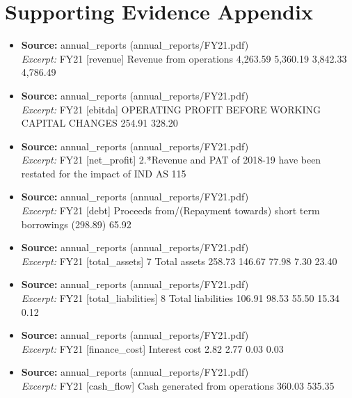 \documentclass[11pt,a4paper]{article}
\begin{document}
\section*{Supporting Evidence Appendix}
\begin{itemize}
\item \textbf{Source:} annual\_reports (annual\_reports/FY21.pdf) \\ \textit{Excerpt:} FY21 [revenue] Revenue from operations                                       4,263.59             5,360.19             3,842.33            4,786.49
\item \textbf{Source:} annual\_reports (annual\_reports/FY21.pdf) \\ \textit{Excerpt:} FY21 [ebitda] OPERATING PROFIT BEFORE WORKING CAPITAL CHANGES                                                 254.91                 328.20
\item \textbf{Source:} annual\_reports (annual\_reports/FY21.pdf) \\ \textit{Excerpt:} FY21 [net\_profit] 2.*Revenue and PAT of 2018-19 have been restated for the impact of IND AS 115
\item \textbf{Source:} annual\_reports (annual\_reports/FY21.pdf) \\ \textit{Excerpt:} FY21 [debt] Proceeds from/(Repayment towards) short term borrowings                                           (298.89)                    65.92
\item \textbf{Source:} annual\_reports (annual\_reports/FY21.pdf) \\ \textit{Excerpt:} FY21 [total\_assets] 7    Total assets                                  258.73              146.67              77.98                7.30              23.40
\item \textbf{Source:} annual\_reports (annual\_reports/FY21.pdf) \\ \textit{Excerpt:} FY21 [total\_liabilities] 8    Total liabilities                             106.91               98.53              55.50              15.34                0.12
\item \textbf{Source:} annual\_reports (annual\_reports/FY21.pdf) \\ \textit{Excerpt:} FY21 [finance\_cost] Interest cost                                                        2.82             2.77             0.03             0.03
\item \textbf{Source:} annual\_reports (annual\_reports/FY21.pdf) \\ \textit{Excerpt:} FY21 [cash\_flow] Cash generated from operations                                                                   360.03                 535.35

\end{itemize}
\end{document}
